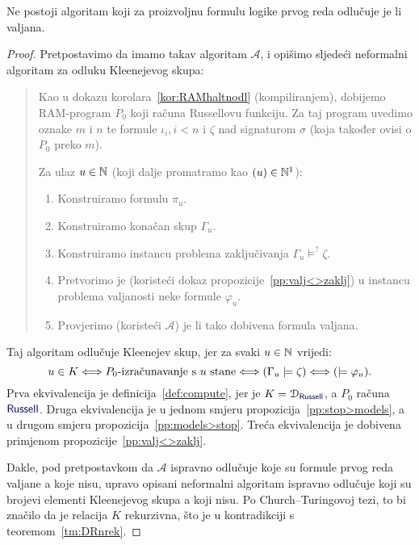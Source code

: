 \begin{teorem}\label{tm:Church}
Ne postoji algoritam koji za proizvoljnu formulu logike prvog reda odlučuje je li valjana.
\end{teorem}
\begin{proof}
Pretpostavimo da imamo takav algoritam $\mathcal A$, i opišimo sljedeći neformalni algoritam za odluku Kleenejevog skupa:
\begin{quote}
Kao u dokazu korolara~\ref{kor:RAMhaltnodl} (kompiliranjem), dobijemo RAM-program $P_0$ koji računa Russellovu funkciju. Za taj program uvedimo oznake $m$ i $n$ te formule $\iota_i,i<n$ i $\zeta$ nad signaturom $\sigma$ (koja također ovisi o $P_0$ preko $m$).

Za ulaz $u\in{\mathbb N}$ (koji dalje promatramo kao $(u)\in{\mathbb N}^1$):
\begin{enumerate}
    \item Konstruiramo formulu $\pi_u$.
    \item Konstruiramo konačan skup $\Gamma_u$.
    \item Konstruiramo instancu problema zaključivanja $\Gamma_u%
    \models^?
    \zeta$.
    \item\label{step:varphi_u} Pretvorimo je (koristeći dokaz propozicije~\ref{pp:valj<>zaklj}) u instancu problema valjanosti neke formule $\varphi_u$.
    \item Provjerimo (koristeći $\mathcal A$) je li tako dobivena formula valjana.
\end{enumerate}
\end{quote}
Taj algoritam odlučuje Kleenejev skup, jer za svaki $u\in{\mathbb N}$ vrijedi:%
\begin{equation}\label{eq:lanaceqv}
    u\in K\Longleftrightarrow\text{$P_0$-izračunavanje s $u$ stane}\Longleftrightarrow(\Gamma_u\models\zeta)\Longleftrightarrow{}(\models\varphi_u)\text.
\end{equation}
Prva ekvivalencija je definicija~\ref{def:compute}, jer je $K=\dom{\f{Russell}}$, a $P_0$ računa $\f{Russell}$. Druga ekvivalencija je u jednom smjeru propozicija~\ref{pp:stop>models}, a u drugom smjeru propozicija~\ref{pp:models>stop}. Treća ekvivalencija je dobivena primjenom propozicije~\ref{pp:valj<>zaklj}.

Dakle, pod pretpostavkom da $\mathcal A$ ispravno odlučuje koje su formule prvog reda valjane a koje nisu, upravo opisani neformalni algoritam ispravno odlučuje koji su brojevi elementi Kleenejevog skupa a koji nisu. Po Church--\!Turingovoj tezi, to bi značilo da je relacija $K$ rekurzivna, što je u kontradikciji s teoremom~\ref{tm:DRnrek}.
\end{proof}

